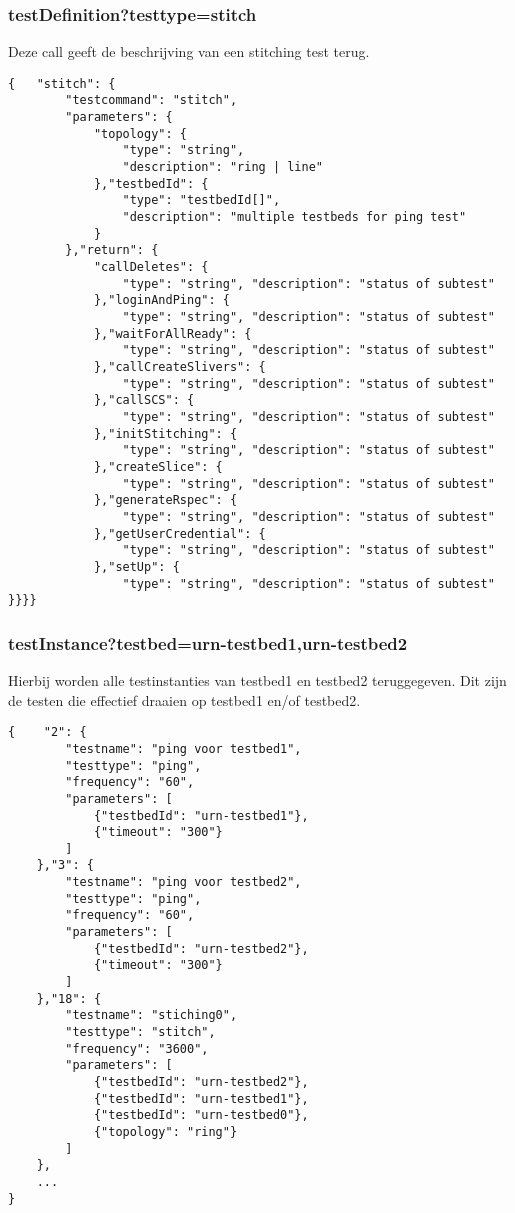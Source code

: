 \clearpage
\subsubsection{testDefinition?testtype=stitch}
Deze call geeft de beschrijving van een stitching test terug.
\begin{verbatim}
{   "stitch": {
        "testcommand": "stitch",
        "parameters": {
            "topology": {
                "type": "string",
                "description": "ring | line"
            },"testbedId": {
                "type": "testbedId[]",
                "description": "multiple testbeds for ping test"
            }
        },"return": {
            "callDeletes": {
                "type": "string", "description": "status of subtest"
            },"loginAndPing": {
                "type": "string", "description": "status of subtest"
            },"waitForAllReady": {
                "type": "string", "description": "status of subtest"
            },"callCreateSlivers": {
                "type": "string", "description": "status of subtest"
            },"callSCS": {
                "type": "string", "description": "status of subtest"
            },"initStitching": {
                "type": "string", "description": "status of subtest"
            },"createSlice": {
                "type": "string", "description": "status of subtest"
            },"generateRspec": {
                "type": "string", "description": "status of subtest"
            },"getUserCredential": {
                "type": "string", "description": "status of subtest"
            },"setUp": {
                "type": "string", "description": "status of subtest"
}}}}
\end{verbatim}
\clearpage
\subsubsection{testInstance?testbed=urn-testbed1,urn-testbed2}
Hierbij worden alle testinstanties van testbed1 en testbed2 teruggegeven. Dit zijn de testen die effectief draaien op testbed1 en/of testbed2.
\begin{verbatim}
{    "2": {
        "testname": "ping voor testbed1",
        "testtype": "ping",
        "frequency": "60",
        "parameters": [
        	{"testbedId": "urn-testbed1"},
            {"timeout": "300"}
        ]
    },"3": {
        "testname": "ping voor testbed2",
        "testtype": "ping",
        "frequency": "60",
        "parameters": [
            {"testbedId": "urn-testbed2"},
            {"timeout": "300"}
        ]
    },"18": {
        "testname": "stiching0",
        "testtype": "stitch",
        "frequency": "3600",
        "parameters": [
            {"testbedId": "urn-testbed2"},
            {"testbedId": "urn-testbed1"},
            {"testbedId": "urn-testbed0"},
            {"topology": "ring"}
        ]
    },	
    ...    
}
\end{verbatim}
\clearpage
